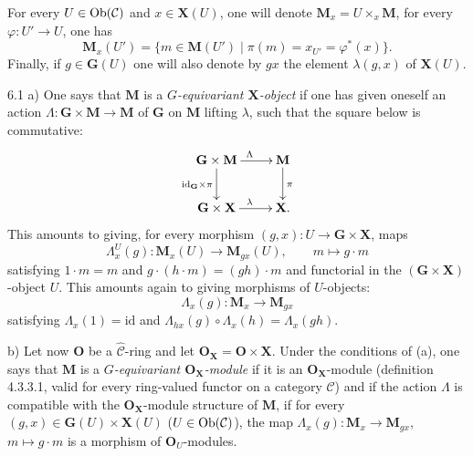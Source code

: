 For every \(U\in\operatorname{Ob}(\mathcal{C})\) and \(x\in\mathbf{X}(U)\), one will denote
\(\mathbf{M}_{x}=U\times_{x}\mathbf{M}\), \ie for every
\(\varphi\colon U'\to U\), one has
\[
\mathbf{M}_{x}(U')
=\{m\in\mathbf{M}(U')\mid \pi(m)=x_{U'}=\varphi^{*}(x)\}.
\]
Finally, if \(g\in\mathbf{G}(U)\) one will also denote by \(gx\) the element
\(\lambda(g,x)\) of \(\mathbf{X}(U)\).

\begin{definition}{6.1}
\label{I.6.1}
a) One says that \(\mathbf{M}\) is a \emph{\(G\)-equivariant
\(\mathbf{X}\)-object} if one has given oneself an action
\(\Lambda\colon\mathbf{G}\times\mathbf{M}\to\mathbf{M}\) of \(\mathbf{G}\) on
\(\mathbf{M}\) lifting \(\lambda\), \ie such that the square below is
commutative:
\[
\xymatrix{
\mathbf{G}\times\mathbf{M} \ar[r]^{\Lambda} \ar[d]_{\mathrm{id}_{\mathbf{G}}\times\pi}
  & \mathbf{M} \ar[d]^{\pi} \\
\mathbf{G}\times\mathbf{X} \ar[r]^{\lambda}
  & \mathbf{X}.
}
\]
This amounts to giving, for every morphism
\((g,x)\colon U\to\mathbf{G}\times\mathbf{X}\), maps
\[
\Lambda^{U}_{x}(g)\colon
\mathbf{M}_{x}(U)\longrightarrow\mathbf{M}_{gx}(U),
\qquad m\longmapsto g\cdot m
\]
satisfying \(1\cdot m=m\) and \(g\cdot(h\cdot m)=(gh)\cdot m\) and functorial in
the \((\mathbf{G}\times\mathbf{X})\)-object \(U\).
This amounts again to giving morphisms of \(U\)-objects:
\[
\Lambda_{x}(g)\colon
\mathbf{M}_{x}\longrightarrow\mathbf{M}_{gx}
\]
satisfying \(\Lambda_{x}(1)=\mathrm{id}\) and
\(\Lambda_{hx}(g)\circ\Lambda_{x}(h)=\Lambda_{x}(gh)\).

b) Let now \(\mathbf{O}\) be a \(\widehat{\mathcal{C}}\)-ring and let
\(\mathbf{O}_{\mathbf{X}}=\mathbf{O}\times\mathbf{X}\). Under the conditions of
(a), one says that \(\mathbf{M}\) is a \emph{\(G\)-equivariant
\(\mathbf{O}_{\mathbf{X}}\)-module} if it is an
\(\mathbf{O}_{\mathbf{X}}\)-module (\cf definition 4.3.3.1, valid for every
ring-valued functor on a category \(\mathcal{C}\)) and if the action
\(\Lambda\) is compatible with the \(\mathbf{O}_{\mathbf{X}}\)-module structure
of \(\mathbf{M}\), \ie if for every
\((g,x)\in\mathbf{G}(U)\times\mathbf{X}(U)\)
(\(U\in\operatorname{Ob}(\mathcal{C})\)), the map
\(\Lambda_{x}(g)\colon\mathbf{M}_{x}\to\mathbf{M}_{gx}\), \(m\mapsto g\cdot m\)
is a morphism of \(\mathbf{O}_{U}\)-modules.
\end{definition}

